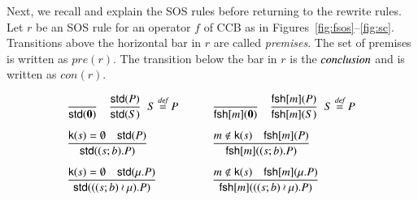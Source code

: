 {Next, we recall and explain the SOS rules before returning to 
the rewrite rules. Let $r$ be an SOS rule for an operator $f$ of CCB as in 
Figures~\ref{fig:fsos}--\ref{fig:sc}. 
Transitions above the horizontal bar in $r$ are called \emph{premises}. 
The set of premises is written as
$pre(r)$. The transition below the bar in $r$ is the $\emph{conclusion}$ and 
is written as $con(r)$. 

%
\begin{figure}[t] 
\[
\begin{array}{ll}
\Rule
{}
{\std{\Nil}} \quad 
\Rule
{\std{P}}
{\std{S}}
\;\;
S \bydef P
\qquad &
\Rule
{}
{\fresh{m}{\Nil}} \quad
\Rule
{\fresh{m}{P}}
{\fresh{m}{S}}
\;\;
S \bydef P
\\[15pt]
%
\Rule
{\kkey{s}=\emptyset \quad  \std{P}}
{\std{(s;b).P}}
\qquad &
\Rule
{m \notin \kkey{s} \quad \fresh{m}{P}}
{\fresh{m}{(s;b).P}}
\\[15pt]
%
\Rule
{\kkey{s}=\emptyset \quad  \std{\mu.P}}
{\std{((s;b)\wr \mu).P}}
\qquad &
\Rule
{m \notin \kkey{s} \quad \fresh{m}{\mu.P}}
{\fresh{m}{((s;b)\wr \mu).P}}
\\[15pt]
%


\end{array}\]
\end{figure}}

